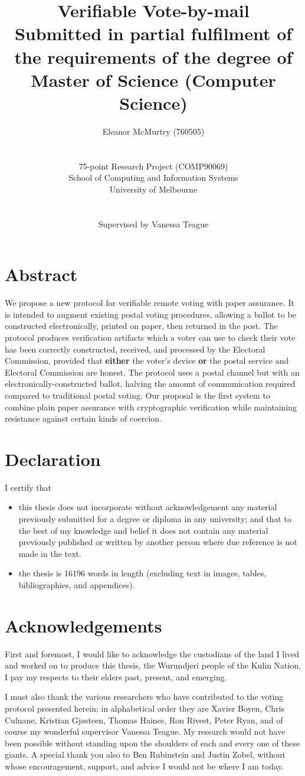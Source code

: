 \documentclass[12pt,a4paper]{article}
\title{Verifiable Vote-by-mail\\\large Submitted in partial fulfilment of the requirements of the degree of\\Master of Science (Computer Science)}
\author{Eleanor McMurtry (760505)\\\\\\75-point Research Project (COMP90069)\\School of Computing and Information Systems\\University of Melbourne\\\\\\Supervised by Vanessa Teague}
\theoremstyle{definition}
\begin{document}
\maketitle
\newpage
\tableofcontents
\newpage
\section*{Abstract}
We propose a new protocol for verifiable remote voting with paper assurance. It is intended to augment existing postal voting procedures, allowing a ballot to be constructed electronically, printed on paper, then returned in the post. The protocol produces verification artifacts which a voter can use to check their vote has been correctly constructed, received, and processed by the Electoral Commission, provided that \textbf{either} the voter's device \textbf{or} the postal service and Electoral Commission are honest. The protocol uses a postal channel but with an electronically-constructed ballot, halving the amount of communication required compared to traditional postal voting. Our proposal is the first system to combine plain paper assurance with cryptographic verification while maintaining resistance against certain kinds of coercion.
\newpage
\section*{Declaration}
I certify that
\begin{itemize}
    \item this thesis does not incorporate without acknowledgement any material previously submitted for a degree or diploma in any university; and that to the best of my knowledge and belief it does not contain any material previously published or written by another person where due reference is not made in the text.
    \item the thesis is 16196 words in length (excluding text in images, tables, bibliographies, and appendices).
\end{itemize}
\newpage
\section*{Acknowledgements}
First and foremost, I would like to acknowledge the custodians of the land I lived and worked on to produce this thesis, the Wurundjeri people of the Kulin Nation. I pay my respects to their elders past, present, and emerging.

I must also thank the various researchers who have contributed to the voting protocol presented herein; in alphabetical order they are Xavier Boyen, Chris Culnane, Kristian Gjøsteen, Thomas Haines, Ron Rivest, Peter Ryan, and of course my wonderful supervisor Vanessa Teague. My research would not have been possible without standing upon the shoulders of each and every one of these giants. A special thank you also to Ben Rubinstein and Justin Zobel, without whose encouragement, support, and advice I would not be where I am today.
\end{document}
